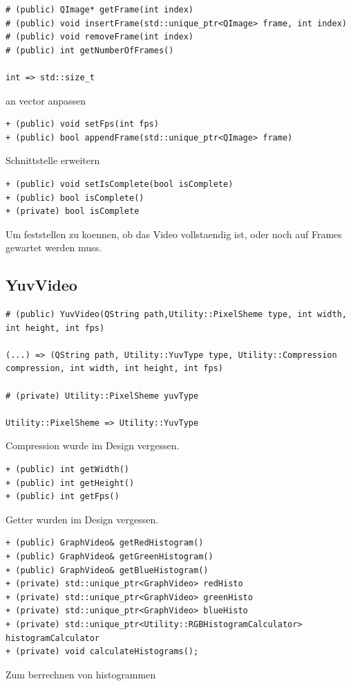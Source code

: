 \documentclass[parskip=full]{scrartcl}
\begin{document}
\begin{verbatim}
# (public) QImage* getFrame(int index)
# (public) void insertFrame(std::unique_ptr<QImage> frame, int index)
# (public) void removeFrame(int index)
# (public) int getNumberOfFrames()

int => std::size_t
\end{verbatim}
an vector anpassen

\begin{verbatim}
+ (public) void setFps(int fps)
+ (public) bool appendFrame(std::unique_ptr<QImage> frame)
\end{verbatim}
Schnittstelle erweitern

\begin{verbatim}
+ (public) void setIsComplete(bool isComplete)
+ (public) bool isComplete()
+ (private) bool isComplete
\end{verbatim}
Um feststellen zu koennen, ob das Video vollstaendig ist, oder noch auf Frames gewartet werden muss.
\subsection{YuvVideo}
\begin{verbatim}
# (public) YuvVideo(QString path,Utility::PixelSheme type, int width, int height, int fps)

(...) => (QString path, Utility::YuvType type, Utility::Compression compression, int width, int height, int fps)

# (private) Utility::PixelSheme yuvType

Utility::PixelSheme => Utility::YuvType
\end{verbatim}
Compression wurde im Design vergessen.

\begin{verbatim}
+ (public) int getWidth()
+ (public) int getHeight()
+ (public) int getFps()
\end{verbatim}
Getter wurden im Design vergessen.

\begin{verbatim}
+ (public) GraphVideo& getRedHistogram()
+ (public) GraphVideo& getGreenHistogram()
+ (public) GraphVideo& getBlueHistogram()
+ (private) std::unique_ptr<GraphVideo> redHisto
+ (private) std::unique_ptr<GraphVideo> greenHisto
+ (private) std::unique_ptr<GraphVideo> blueHisto
+ (private) std::unique_ptr<Utility::RGBHistogramCalculator> histogramCalculator
+ (private) void calculateHistograms();
\end{verbatim}
Zum berrechnen von histogrammen
\end{document}
